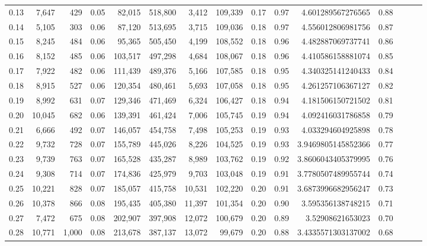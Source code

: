 \begin{tabular}{rrrrrrrrrrrrrrr}
0.13 &   7,647 &    429 &  0.05 &   82,015 &  518,800 &    3,412 &  109,339 &  0.17 &  0.97 &     4.601289567276565 &      0.88 \\
0.14 &   5,105 &    303 &  0.06 &   87,120 &  513,695 &    3,715 &  109,036 &  0.18 &  0.97 &     4.556012806981756 &      0.87 \\
0.15 &   8,245 &    484 &  0.06 &   95,365 &  505,450 &    4,199 &  108,552 &  0.18 &  0.96 &     4.482887069737741 &      0.86 \\
0.16 &   8,152 &    485 &  0.06 &  103,517 &  497,298 &    4,684 &  108,067 &  0.18 &  0.96 &     4.410586158881074 &      0.85 \\
0.17 &   7,922 &    482 &  0.06 &  111,439 &  489,376 &    5,166 &  107,585 &  0.18 &  0.95 &     4.340325141240433 &      0.84 \\
0.18 &   8,915 &    527 &  0.06 &  120,354 &  480,461 &    5,693 &  107,058 &  0.18 &  0.95 &     4.261257106367127 &      0.82 \\
0.19 &   8,992 &    631 &  0.07 &  129,346 &  471,469 &    6,324 &  106,427 &  0.18 &  0.94 &     4.181506150721502 &      0.81 \\
0.20 &  10,045 &    682 &  0.06 &  139,391 &  461,424 &    7,006 &  105,745 &  0.19 &  0.94 &     4.092416031786858 &      0.79 \\
0.21 &   6,666 &    492 &  0.07 &  146,057 &  454,758 &    7,498 &  105,253 &  0.19 &  0.93 &     4.033294604925898 &      0.78 \\
0.22 &   9,732 &    728 &  0.07 &  155,789 &  445,026 &    8,226 &  104,525 &  0.19 &  0.93 &    3.9469805145852366 &      0.77 \\
0.23 &   9,739 &    763 &  0.07 &  165,528 &  435,287 &    8,989 &  103,762 &  0.19 &  0.92 &    3.8606043405379995 &      0.76 \\
0.24 &   9,308 &    714 &  0.07 &  174,836 &  425,979 &    9,703 &  103,048 &  0.19 &  0.91 &    3.7780507489955744 &      0.74 \\
0.25 &  10,221 &    828 &  0.07 &  185,057 &  415,758 &   10,531 &  102,220 &  0.20 &  0.91 &    3.6873996682956247 &      0.73 \\
0.26 &  10,378 &    866 &  0.08 &  195,435 &  405,380 &   11,397 &  101,354 &  0.20 &  0.90 &     3.595356138748215 &      0.71 \\
0.27 &   7,472 &    675 &  0.08 &  202,907 &  397,908 &   12,072 &  100,679 &  0.20 &  0.89 &      3.52908621653023 &      0.70 \\
0.28 &  10,771 &  1,000 &  0.08 &  213,678 &  387,137 &   13,072 &   99,679 &  0.20 &  0.88 &    3.4335571303137002 &      0.68 \\

\end{tabular}
